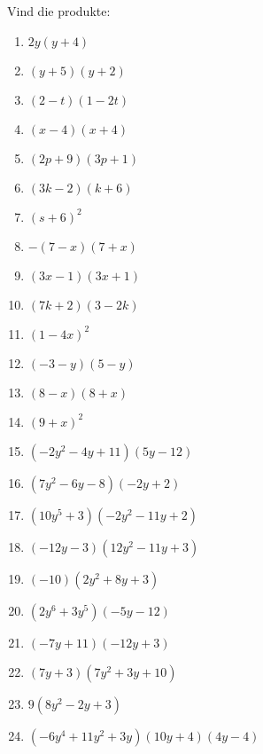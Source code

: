 \begin{exercises}{}
{
Vind die produkte:

\begin{multicols}{2}
\begin{enumerate}[label=\textbf{\arabic*}., itemsep=5pt]
\item $2y(y+4)$ 
\item $(y+5)(y+2) $
\item $(2-t)(1-2t)$
\item $(x-4)(x+4)$
\item $ (2p+9)(3p+1)$
\item $(3k-2)(k+6)$
\item $(s+6)^2$
\item $-(7-x)(7+x)$
\item $(3x-1)(3x+1)$
\item $(7k+2)(3-2k)$
\item $(1-4x)^2$
\item $(-3-y)(5-y)$
\item $(8-x)(8+x)$
\item $(9+x)^2$
\item$(-2{y}^{2}-4y+11)(5y-12)$ 
\item$(7{y}^{2}-6y-8)(-2y+2)$%
\item$(10{y}^{5}+3)(-2{y}^{2}-11y+2)$ 
\item$(-12y-3)(12{y}^{2}-11y+3)$%
\item$(-10)(2{y}^{2}+8y+3)$ 
\item$(2{y}^{6}+3{y}^{5})(-5y-12)$%
\item$(-7y+11)(-12y+3)$%
\item$(7y+3)(7{y}^{2}+3y+10)$%
\item$9(8{y}^{2}-2y+3)$ 
\item$(-6{y}^{4}+11{y}^{2}+3y)(10y+4)(4y-4)$ 
\end{enumerate}
\end{multicols}

}
\end{exercises}
